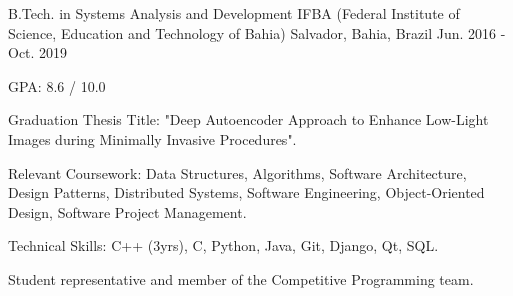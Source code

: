 \begin{cventries}
  \cventry
    {B.Tech. in Systems Analysis and Development} %
    {IFBA (Federal Institute of Science, Education and Technology of Bahia)} %
    {Salvador, Bahia, Brazil} %
    {Jun. 2016 - Oct. 2019} %
    {
      \begin{cvitems} %
        \item {GPA: 8.6 / 10.0}
        \item {Graduation Thesis Title: "Deep Autoencoder Approach to Enhance Low-Light Images during Minimally Invasive Procedures".}
        \item {Relevant Coursework: Data Structures, Algorithms, Software Architecture, Design Patterns, Distributed Systems, Software Engineering, Object-Oriented Design, Software Project Management.}
        \item {Technical Skills: C++ (3yrs), C, Python, Java, Git, Django, Qt, SQL.}
        \item {Student representative and member of the Competitive Programming team.}
      \end{cvitems}
    }

\end{cventries}

